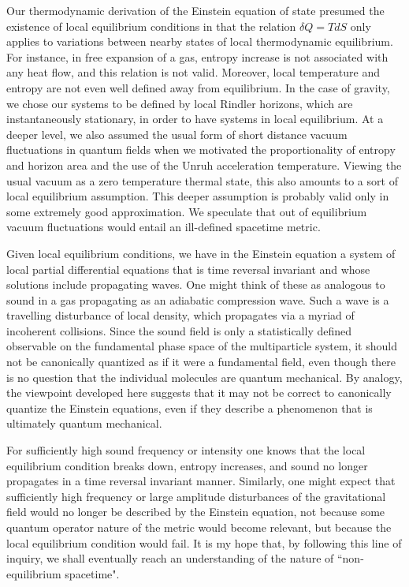 \documentclass[12pt]{article}
\begin{document}
Our thermodynamic derivation of the Einstein equation of state
presumed the existence of local equilibrium conditions
in that the relation $\delta Q=T dS$ only applies
to variations between nearby states of local thermodynamic
equilibrium. For instance, in free expansion of a gas, entropy
increase is not associated with any heat flow, and this relation
is not valid. Moreover, local temperature and entropy are not
 even well defined away from equilibrium.
In the case of gravity, we chose our systems to be defined by
local Rindler horizons, which are instantaneously stationary, in
order to have systems in local equilibrium.
At a deeper level, we also assumed the usual form of short
distance vacuum fluctuations in quantum fields when we motivated
the proportionality of entropy and horizon area and the use of
the Unruh acceleration temperature.
Viewing the usual vacuum as a zero temperature thermal
state\cite{sciama}, this also amounts to a sort of local
equilibrium assumption. This deeper
assumption is probably valid only in some extremely good approximation.
We speculate that out of equilibrium vacuum fluctuations
would entail an ill-defined spacetime metric.

Given local equilibrium conditions, we have in the Einstein equation
a system of local partial differential equations that is time reversal
invariant and whose solutions include propagating waves. One might think of
these as analogous to sound in a gas propagating as an adiabatic
compression wave. Such a wave is a travelling disturbance
of local density, which propagates via a myriad of incoherent collisions.
Since the sound field is only a statistically defined observable
on the fundamental phase space of the multiparticle system,
it should not be canonically quantized as if it were a fundamental
field, even though there
is no question that the individual molecules are quantum mechanical.
By analogy, the viewpoint developed here suggests that it may
not be correct to canonically quantize the Einstein equations,
even if they describe a phenomenon that is ultimately quantum mechanical.

For sufficiently high sound frequency or intensity one knows that
the local equilibrium condition breaks down, entropy increases,
and sound no longer propagates in a time reversal invariant manner.
Similarly, one might expect that sufficiently high frequency or
large amplitude disturbances of the gravitational field would
no longer be described by the Einstein equation, not because
some quantum operator nature of the metric would become relevant,
but because the local equilibrium condition would fail.
It is my hope that, by following this line of inquiry, we
shall eventually reach an understanding
of  the nature of ``non-equilibrium spacetime".
\end{document}
